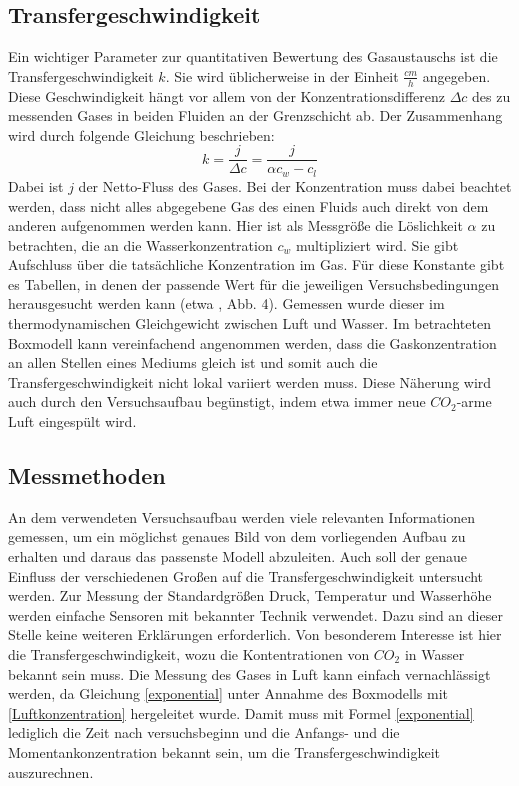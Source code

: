 \documentclass[12pt]{article}
\begin{document}
\subsection{Transfergeschwindigkeit}
Ein wichtiger Parameter zur quantitativen Bewertung des Gasaustauschs ist die Transfergeschwindigkeit $k$. Sie wird üblicherweise in der Einheit $\frac{cm}{h}$ angegeben.
Diese Geschwindigkeit hängt vor allem von der Konzentrationsdifferenz $\Delta c$ des zu messenden Gases in beiden Fluiden an der Grenzschicht ab. Der Zusammenhang wird durch folgende Gleichung beschrieben: 
\begin{equation}\label{transfergeschwindigkeit}
	k = \frac{j}{\Delta c} = \frac{j}{\alpha c_w - c_l}
\end{equation}
Dabei ist $j$ der Netto-Fluss des Gases.
Bei der Konzentration muss dabei beachtet werden, dass nicht alles abgegebene Gas des einen Fluids auch direkt von dem anderen aufgenommen werden kann. Hier ist als Messgröße die Löslichkeit $\alpha$ zu betrachten, die an die Wasserkonzentration $c_w$ multipliziert wird. Sie gibt Aufschluss über die tatsächliche Konzentration im Gas. Für diese Konstante gibt es Tabellen, in denen der passende Wert für die jeweiligen Versuchsbedingungen herausgesucht werden kann (etwa \cite{jaehne}, Abb. 4). Gemessen wurde dieser im thermodynamischen Gleichgewicht  zwischen Luft und Wasser.
Im betrachteten Boxmodell kann vereinfachend angenommen werden, dass die Gaskonzentration an allen Stellen eines Mediums gleich ist und somit auch die Transfergeschwindigkeit nicht lokal variiert werden muss.
Diese Näherung wird auch durch den Versuchsaufbau begünstigt, indem etwa immer neue $CO_2$-arme Luft eingespült wird.

\subsection{Messmethoden}\label{sub:Messmethoden}
An dem verwendeten Versuchsaufbau werden viele relevanten Informationen gemessen, um ein möglichst genaues Bild von dem vorliegenden Aufbau zu erhalten und daraus das passenste Modell abzuleiten. Auch soll der genaue Einfluss der verschiedenen Großen auf die Transfergeschwindigkeit untersucht werden. 
Zur Messung der Standardgrößen Druck, Temperatur und Wasserhöhe werden einfache Sensoren mit bekannter Technik verwendet. Dazu sind an dieser Stelle keine weiteren Erklärungen erforderlich.
Von besonderem Interesse ist hier die Transfergeschwindigkeit, wozu die Kontentrationen von $CO_2$ in Wasser bekannt sein muss. Die Messung des Gases in Luft kann einfach vernachlässigt werden, da Gleichung \eqref{exponential} unter Annahme des Boxmodells mit \ref{Luftkonzentration} hergeleitet wurde.
Damit muss mit Formel \ref{exponential} lediglich die Zeit nach versuchsbeginn und die Anfangs- und die Momentankonzentration bekannt sein, um die Transfergeschwindigkeit auszurechnen. \\
\end{document}
